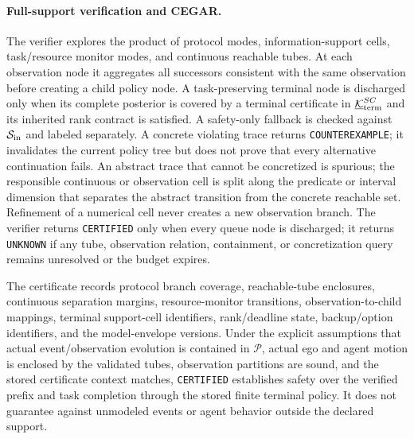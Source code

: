 \documentclass[letterpaper]{article} %
\begin{document}
\paragraph{Full-support verification and CEGAR.}
The verifier explores the product of protocol modes, information-support cells, task/resource monitor modes, and continuous reachable tubes. At each observation node it aggregates all successors consistent with the same observation before creating a child policy node. A task-preserving terminal node is discharged only when its complete posterior is covered by a terminal certificate in $\underline{\mathcal K}_{\rm term}^{SC}$ and its inherited rank contract is satisfied. A safety-only fallback is checked against $\mathcal S_{\rm in}$ and labeled separately. A concrete violating trace returns \texttt{COUNTEREXAMPLE}; it invalidates the current policy tree but does not prove that every alternative continuation fails. An abstract trace that cannot be concretized is spurious; the responsible continuous or observation cell is split along the predicate or interval dimension that separates the abstract transition from the concrete reachable set. Refinement of a numerical cell never creates a new observation branch. The verifier returns \texttt{CERTIFIED} only when every queue node is discharged; it returns \texttt{UNKNOWN} if any tube, observation relation, containment, or concretization query remains unresolved or the budget expires.

The certificate records protocol branch coverage, reachable-tube enclosures, continuous separation margins, resource-monitor transitions, observation-to-child mappings, terminal support-cell identifiers, rank/deadline state, backup/option identifiers, and the model-envelope versions. Under the explicit assumptions that actual event/observation evolution is contained in $\mathcal P$, actual ego and agent motion is enclosed by the validated tubes, observation partitions are sound, and the stored certificate context matches, \texttt{CERTIFIED} establishes safety over the verified prefix and task completion through the stored finite terminal policy. It does not guarantee against unmodeled events or agent behavior outside the declared support.
\end{document}
